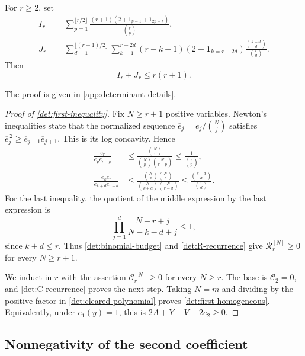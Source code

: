 \begin{lemma}\label{det:binomial-budget}
For $r\geq2$, set
\begin{align*}
 I_r&=\sum_{p=1}^{\lfloor r/2\rfloor}
       \frac{(r+1)(2+\mathbf1_{p=1}+\mathbf1_{2p=r})}{\binom rp},\\
 J_r&=\sum_{d=1}^{\lfloor(r-1)/2\rfloor}\sum_{k=1}^{r-2d}
       (r-k+1)(2+\mathbf1_{k=r-2d})
       \frac{\binom{k+d}{d}}{\binom rd}.
\end{align*}
Then
\begin{equation}\label{det:scalar-budget}
 I_r+J_r\leq r(r+1).
\end{equation}
\end{lemma}

The proof is given in \cref{app:determinant-details}.

\begin{proof}[Proof of \cref{det:first-inequality}]
Fix $N\geq r+1$ positive variables.  Newton's inequalities state that
the normalized sequence $\overline e_j=e_j/\binom Nj$ satisfies
\(\overline e_j^{\,2}\geq\overline e_{j-1}\overline e_{j+1}\).
This is its log concavity.  Hence
\begin{align}
 \frac{e_r}{e_pe_{r-p}}
 &\leq\frac{\binom Nr}{\binom Np\binom N{r-p}}
 \leq\frac1{\binom rp},\label{det:newton-one}\\
 \frac{e_ke_r}{e_{k+d}e_{r-d}}
 &\leq\frac{\binom Nk\binom Nr}
           {\binom N{k+d}\binom N{r-d}}
 \leq\frac{\binom{k+d}{d}}{\binom rd}.
 \label{det:newton-two}
\end{align}
For the last inequality, the quotient of the middle expression by the
last expression is
\[
 \prod_{j=1}^d\frac{N-r+j}{N-k-d+j}\leq1,
\]
since $k+d\leq r$.  Thus \cref{det:binomial-budget} and
\eqref{det:R-recurrence} give $\mathcal R_r^{[N]}\geq0$ for every
$N\geq r+1$.

We induct in $r$ with the assertion
$\mathcal C_r^{[N]}\geq0$ for every $N\geq r$.  The base is
$\mathcal C_2=0$, and \eqref{det:C-recurrence} proves the next step.
Taking $N=m$ and dividing by the positive factor in
\eqref{det:cleared-polynomial} proves
\eqref{det:first-homogeneous}.  Equivalently, under $e_1(y)=1$, this is
$2A+Y-V-2e_2\geq0$.
\end{proof}

\subsection{Nonnegativity of the second coefficient}
\label{det:second-section}

